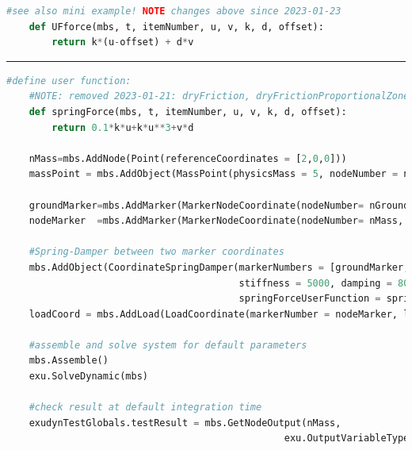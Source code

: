     \finishTable
    \userFunctionExample{}
    \pythonstyle
    \begin{lstlisting}[language=Python]
    #see also mini example! NOTE changes above since 2023-01-23
    def UFforce(mbs, t, itemNumber, u, v, k, d, offset):
        return k*(u-offset) + d*v
    \end{lstlisting}
\vspace{6pt}\par\noindent\rule{\textwidth}{0.4pt}
\label{miniExample_ObjectConnectorCoordinateSpringDamper}
\pythonstyle
\begin{lstlisting}[language=Python, firstnumber=1]
    #define user function:
    #NOTE: removed 2023-01-21: dryFriction, dryFrictionProportionalZone
    def springForce(mbs, t, itemNumber, u, v, k, d, offset): 
        return 0.1*k*u+k*u**3+v*d

    nMass=mbs.AddNode(Point(referenceCoordinates = [2,0,0]))
    massPoint = mbs.AddObject(MassPoint(physicsMass = 5, nodeNumber = nMass))
    
    groundMarker=mbs.AddMarker(MarkerNodeCoordinate(nodeNumber= nGround, coordinate = 0))
    nodeMarker  =mbs.AddMarker(MarkerNodeCoordinate(nodeNumber= nMass, coordinate = 0))
    
    #Spring-Damper between two marker coordinates
    mbs.AddObject(CoordinateSpringDamper(markerNumbers = [groundMarker, nodeMarker], 
                                         stiffness = 5000, damping = 80, 
                                         springForceUserFunction = springForce)) 
    loadCoord = mbs.AddLoad(LoadCoordinate(markerNumber = nodeMarker, load = 1)) #static linear solution:0.002

    #assemble and solve system for default parameters
    mbs.Assemble()
    exu.SolveDynamic(mbs)

    #check result at default integration time
    exudynTestGlobals.testResult = mbs.GetNodeOutput(nMass, 
                                                 exu.OutputVariableType.Displacement)[0]

\end{lstlisting}


